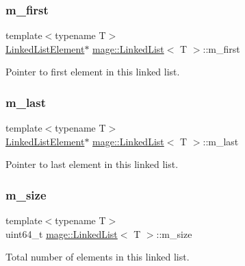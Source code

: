 \subsubsection{\texorpdfstring{m\+\_\+first}{m\_first}}
{\footnotesize\ttfamily template$<$typename T$>$ \\
\hyperlink{structmage_1_1_linked_list_1_1_linked_list_element}{Linked\+List\+Element}$\ast$ \hyperlink{classmage_1_1_linked_list}{mage\+::\+Linked\+List}$<$ T $>$\+::m\+\_\+first\hspace{0.3cm}{\ttfamily [private]}}

Pointer to first element in this linked list. \hypertarget{classmage_1_1_linked_list_acb461a96b93fa3917b7ed2e30fe67fce}{}\label{classmage_1_1_linked_list_acb461a96b93fa3917b7ed2e30fe67fce} 
\subsubsection{\texorpdfstring{m\+\_\+last}{m\_last}}
{\footnotesize\ttfamily template$<$typename T$>$ \\
\hyperlink{structmage_1_1_linked_list_1_1_linked_list_element}{Linked\+List\+Element}$\ast$ \hyperlink{classmage_1_1_linked_list}{mage\+::\+Linked\+List}$<$ T $>$\+::m\+\_\+last\hspace{0.3cm}{\ttfamily [private]}}

Pointer to last element in this linked list. \hypertarget{classmage_1_1_linked_list_a1a1be1f46f0bc704e6387833b9528909}{}\label{classmage_1_1_linked_list_a1a1be1f46f0bc704e6387833b9528909} 
\subsubsection{\texorpdfstring{m\+\_\+size}{m\_size}}
{\footnotesize\ttfamily template$<$typename T$>$ \\
uint64\+\_\+t \hyperlink{classmage_1_1_linked_list}{mage\+::\+Linked\+List}$<$ T $>$\+::m\+\_\+size\hspace{0.3cm}{\ttfamily [private]}}

Total number of elements in this linked list. 